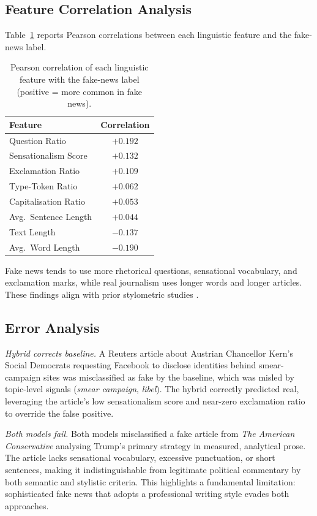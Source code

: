 \documentclass[10pt,twoside]{article}
\begin{document}
\subsection{Feature Correlation Analysis}

Table~\ref{tab:corr} reports Pearson correlations between
each linguistic feature and the fake-news label.

\begin{table}[h]
\caption{Pearson correlation of each linguistic feature with
         the fake-news label (positive = more common in fake
         news).}
\label{tab:corr}
\small
\begin{tabular}{lc}
\toprule
\textbf{Feature} & \textbf{Correlation} \\
\midrule
Question Ratio        & $+0.192$ \\
Sensationalism Score  & $+0.132$ \\
Exclamation Ratio     & $+0.109$ \\
Type-Token Ratio      & $+0.062$ \\
Capitalisation Ratio  & $+0.053$ \\
Avg.\ Sentence Length & $+0.044$ \\
Text Length           & $-0.137$ \\
Avg.\ Word Length     & $-0.190$ \\
\bottomrule
\end{tabular}
\end{table}

Fake news tends to use more rhetorical questions, sensational
vocabulary, and exclamation marks, while real journalism uses
longer words and longer articles.
These findings align with prior stylometric studies
\citep{rashkin2017truth}.

\subsection{Error Analysis}

\textit{Hybrid corrects baseline.}
A Reuters article about Austrian Chancellor Kern's Social
Democrats requesting Facebook to disclose identities behind
smear-campaign sites was misclassified as fake by the
baseline, which was misled by topic-level signals
(\emph{smear campaign}, \emph{libel}).
The hybrid correctly predicted real, leveraging the article's
low sensationalism score and near-zero exclamation ratio to
override the false positive.

\textit{Both models fail.}
Both models misclassified a fake article from
\emph{The American Conservative} analysing Trump's primary
strategy in measured, analytical prose.
The article lacks sensational vocabulary, excessive
punctuation, or short sentences, making it indistinguishable
from legitimate political commentary by both semantic and
stylistic criteria.
This highlights a fundamental limitation: sophisticated fake
news that adopts a professional writing style evades both
approaches.
\end{document}
